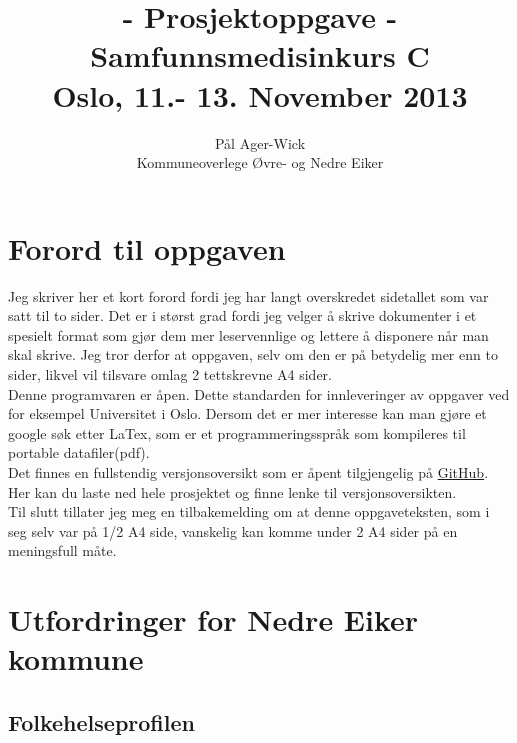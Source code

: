 \documentclass[11pt]{memoir} %
\title{- Prosjektoppgave - \\ Samfunnsmedisinkurs C \\ Oslo, 11.- 13. November 2013}
\author{Pål Ager-Wick \\ Kommuneoverlege Øvre- og Nedre Eiker}
\date{} %
\begin{document}
			\renewcommand{\chaptername}{Del}
            \renewcommand{\contentsname}{Innhold}
            \renewcommand\listfigurename{Illustrasjoner}
            \renewcommand\tablename{Tabell}
			\renewcommand\listtablename{Tabeller}
            \renewcommand{\figurename}{Illustrasjon}

\frontmatter

\maketitle

\chapter{Forord til oppgaven}
	Jeg skriver her et kort forord fordi jeg har langt overskredet sidetallet som var satt til to sider. Det er i størst grad fordi jeg velger å skrive dokumenter i et spesielt format som gjør dem mer leservennlige og lettere å disponere når man skal skrive. Jeg tror derfor at oppgaven, selv om den er på betydelig mer enn to sider, likvel vil tilsvare omlag 2 tettskrevne A4 sider.\\

	Denne programvaren er åpen. Dette standarden for innleveringer av oppgaver ved for eksempel Universitet i Oslo. Dersom det er mer interesse kan man gjøre et google søk etter LaTex, som er et programmeringsspråk som kompileres til portable datafiler(pdf).\\

	Det finnes en fullstendig versjonsoversikt som er åpent tilgjengelig på \href{http://pcjawick.github.io/Folkehelseoppgave}{GitHub}. Her kan du laste ned hele prosjektet og finne lenke til versjonsoversikten.\\

	Til slutt tillater jeg meg en tilbakemelding om at denne oppgaveteksten, som i seg selv var på 1/2 A4 side, vanskelig kan komme under 2 A4 sider på en meningsfull måte.



\newpage

\tableofcontents

\mainmatter

\chapter{Utfordringer for Nedre Eiker kommune}
	\section{Folkehelseprofilen}
\end{document}
